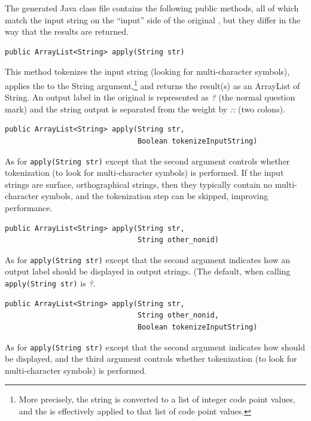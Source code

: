 The generated Java class file contains the following public methods, all of which match the
input string on the ``input'' side of the original \fsm{}, but they differ in the way that the
results are returned.

\begin{Verbatim}
public ArrayList<String> apply(String str)
\end{Verbatim}

\noindent
This method tokenizes the input string (looking for multi-character symbols),
applies the \fsm{} to the String argument,\footnote{More precisely, the string is converted to
a list of integer code point values, and the \fsm{} is effectively applied to that list of code
point values.}  and returns the result(s) as 
an ArrayList of String.  An output label  in the original \fsm{} is
represented as \emph{?} (the normal question mark) and the
string output is separated from the weight by \emph{::} (two colons).

\begin{Verbatim}
public ArrayList<String> apply(String str, 
                               Boolean tokenizeInputString)
\end{Verbatim}

\noindent
As for \texttt{apply(String str)} except that the second argument controls whether tokenization
(to look for multi-character symbols) is performed.  If the input strings are surface,
orthographical strings, then they typically contain no multi-character symbols, and the
tokenization step can be skipped, improving performance.

\begin{Verbatim}
public ArrayList<String> apply(String str, 
                               String other_nonid)
\end{Verbatim}

\noindent
As for \texttt{apply(String str)} except that the second argument indicates how an output label
 should be displayed in output strings.  (The default, when calling
\texttt{apply(String str)} is \emph{?}.

\begin{Verbatim}
public ArrayList<String> apply(String str, 
                               String other_nonid, 
                               Boolean tokenizeInputString)
\end{Verbatim}

\noindent
As for \texttt{apply(String str)} except that the second argument indicates how
 should be displayed, and the third argument controls whether tokenization (to
look for multi-character symbols) is performed.


